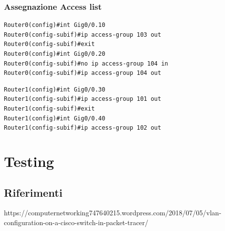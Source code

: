 \documentclass[a4paper,12pt]{report}
\begin{document}
\subsection{Assegnazione Access list}
\begin{verbatim}
Router0(config)#int Gig0/0.10
Router0(config-subif)#ip access-group 103 out
Router0(config-subif)#exit
Router0(config)#int Gig0/0.20
Router0(config-subif)#no ip access-group 104 in
Router0(config-subif)#ip access-group 104 out    
\end{verbatim}
\begin{verbatim}
Router1(config)#int Gig0/0.30
Router1(config-subif)#ip access-group 101 out
Router1(config-subif)#exit
Router1(config)#int Gig0/0.40
Router1(config-subif)#ip access-group 102 out
\end{verbatim}
\chapter{Testing}
\label{chap:testing}
\section{Riferimenti}
https://computernetworking747640215.wordpress.com/2018/07/05/vlan-configuration-on-a-cisco-switch-in-packet-tracer/
%
\end{document}
